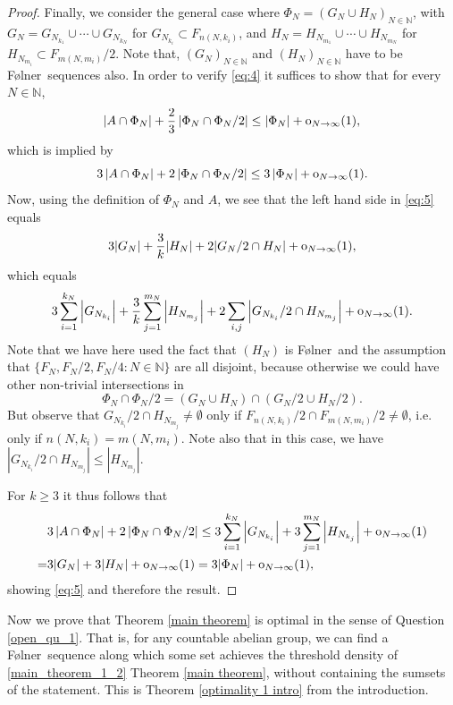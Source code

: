 \documentclass[reqno]{amsart}
\def\N{{\mathbb N}}
\theoremstyle{definition}
\theoremstyle{remark}
\theoremstyle{remark}
\def\N{{\mathbb N}}
\newcommand{\Folner}{F\o{}lner}
\newcommand{\oh}{{\rm o}}
\begin{document}
\begin{proof}
Finally, we consider the general case where $\Phi_N=(G_N \cup H_N)_{N\in \N}$, with $G_N=G_{N_{k_1}}\cup \cdots \cup G_{N_{k_N}}$ for $G_{N_{k_i}}\subset F_{n(N,k_i)}$, and $H_N=H_{N_{m_1}}\cup \cdots \cup H_{N_{m_N}}$ for 
$H_{N_{m_i}} \subset F_{m(N,m_i)}/2$. Note that, $(G_N)_{N\in \N}$ and $(H_N)_{N\in \N}$ have to be \Folner\ sequences also. 
In order to verify \eqref{eq:4} it 
suffices to show that for every $N\in \N$, 
$$\left| A\cap \Phi_N \right| + \frac{2}{3} \left| \Phi_N\cap \Phi_N/2 \right| \leq \left| \Phi_N \right| + \oh_{N\to\infty}(1),$$
which is implied by
\begin{equation}\label{eq:5}
3\left| A\cap \Phi_N \right| + 2\left| \Phi_N\cap \Phi_N/2 \right| \leq 3 \left| \Phi_N \right| + \oh_{N\to\infty}(1).  
\end{equation}
Now, using the definition of $\Phi_N$ and $A$, we see that the 
left hand side in \eqref{eq:5} equals 
$$ 3|G_N|+\frac{3}{k}|H_N|+2 |G_N/2\cap H_N| + \oh_{N\to\infty}(1),$$
which equals
$$3\sum_{i=1}^{k_N}\left|G_{N_{k_i}}\right| + \frac{3}{k}\sum_{j=1}^{m_N} \left| H_{N_{m_j}} \right| + 
2 \sum_{i,j} \left| G_{N_{k_i}}/2 \cap H_{N_{m_j}}  \right| + \oh_{N\to\infty}(1). $$
Note that we have here used the fact that $(H_N)$ is \Folner\ and the assumption that 
$\{F_N,F_N/2,F_N/4:N\in \N\}$ are all disjoint, because otherwise 
we could have other non-trivial intersections in 
$$\Phi_N\cap \Phi_N/2=(G_N\cup H_N)\cap (G_N/2\cup H_N/2).$$ 
But observe that $G_{N_{k_i}}/2 \cap H_{N_{m_j}} \neq \emptyset$ only if $F_{n(N,k_i)}/2 \cap F_{m(N,m_i)}/2 \neq \emptyset$, i.e. only if $n(N,k_i)=m(N,m_i)$. Note also that in this case, we have $|G_{N_{k_i}}/2 \cap H_{N_{m_j}}|\leq |H_{N_{m_j}}|$. 

For $k\geq 3$ it thus follows that
\begin{align*}
& 3\left| A\cap \Phi_N \right| + 2\left| \Phi_N\cap \Phi_N/2 \right| \leq 3 \sum_{i=1}^{k_N}\left|G_{N_{k_i}}\right| + 3 \sum_{j=1}^{m_N}\left|H_{N_{k_j}}\right| + \oh_{N\to\infty}(1) \\ 
=& 3|G_N|+3|H_N|+\oh_{N\to\infty}(1)=3|\Phi_N|+\oh_{N\to\infty}(1),    
\end{align*}
showing \eqref{eq:5} and therefore the result. 
\end{proof}

Now we prove that Theorem \ref{main theorem} is optimal in 
the sense of Question \ref{open_qu_1}. That is, for 
any countable abelian group, we can find a \Folner\ sequence 
along which some set achieves the threshold density of 
\eqref{main_theorem_1_2} Theorem \ref{main theorem}, without 
containing the sumsets of the statement. This is Theorem \ref{optimality 1 intro} from the introduction.
\end{document}

